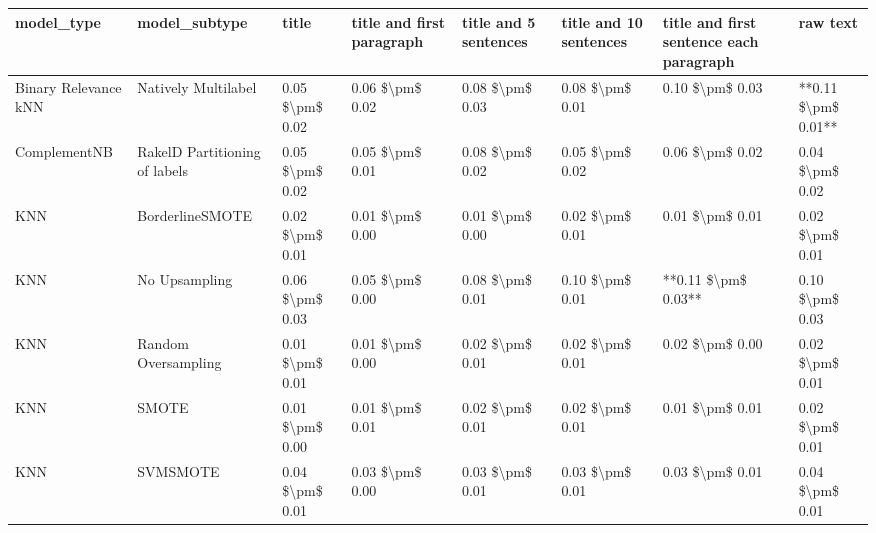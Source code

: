 \begin{tabular}{llllllll}
\toprule
                     model\_type &                 model\_subtype &           title & title and first paragraph & title and 5 sentences & title and 10 sentences & title and first sentence each paragraph &            raw text \\
\midrule
           Binary Relevance kNN &           Natively Multilabel & 0.05 \$\textbackslash pm\$ 0.02 &           0.06 \$\textbackslash pm\$ 0.02 &       0.08 \$\textbackslash pm\$ 0.03 &        0.08 \$\textbackslash pm\$ 0.01 &                         0.10 \$\textbackslash pm\$ 0.03 & **0.11 \$\textbackslash pm\$ 0.01** \\
                   ComplementNB & RakelD Partitioning of labels & 0.05 \$\textbackslash pm\$ 0.02 &           0.05 \$\textbackslash pm\$ 0.01 &       0.08 \$\textbackslash pm\$ 0.02 &        0.05 \$\textbackslash pm\$ 0.02 &                         0.06 \$\textbackslash pm\$ 0.02 &     0.04 \$\textbackslash pm\$ 0.02 \\
                            KNN &               BorderlineSMOTE & 0.02 \$\textbackslash pm\$ 0.01 &           0.01 \$\textbackslash pm\$ 0.00 &       0.01 \$\textbackslash pm\$ 0.00 &        0.02 \$\textbackslash pm\$ 0.01 &                         0.01 \$\textbackslash pm\$ 0.01 &     0.02 \$\textbackslash pm\$ 0.01 \\
                            KNN &                 No Upsampling & 0.06 \$\textbackslash pm\$ 0.03 &           0.05 \$\textbackslash pm\$ 0.00 &       0.08 \$\textbackslash pm\$ 0.01 &        0.10 \$\textbackslash pm\$ 0.01 &                     **0.11 \$\textbackslash pm\$ 0.03** &     0.10 \$\textbackslash pm\$ 0.03 \\
                            KNN &           Random Oversampling & 0.01 \$\textbackslash pm\$ 0.01 &           0.01 \$\textbackslash pm\$ 0.00 &       0.02 \$\textbackslash pm\$ 0.01 &        0.02 \$\textbackslash pm\$ 0.01 &                         0.02 \$\textbackslash pm\$ 0.00 &     0.02 \$\textbackslash pm\$ 0.01 \\
                            KNN &                         SMOTE & 0.01 \$\textbackslash pm\$ 0.00 &           0.01 \$\textbackslash pm\$ 0.01 &       0.02 \$\textbackslash pm\$ 0.01 &        0.02 \$\textbackslash pm\$ 0.01 &                         0.01 \$\textbackslash pm\$ 0.01 &     0.02 \$\textbackslash pm\$ 0.01 \\
                            KNN &                      SVMSMOTE & 0.04 \$\textbackslash pm\$ 0.01 &           0.03 \$\textbackslash pm\$ 0.00 &       0.03 \$\textbackslash pm\$ 0.01 &        0.03 \$\textbackslash pm\$ 0.01 &                         0.03 \$\textbackslash pm\$ 0.01 &     0.04 \$\textbackslash pm\$ 0.01 \\

\end{tabular}
